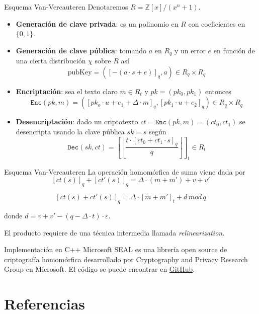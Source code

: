 \documentclass{beamer}
\begin{document}
\begin{frame}{Esquema Van-Vercauteren}
    Denotaremos $ R = \mathbb{Z} [x]/(x^n + 1) $.
\begin{itemize}
    \item \textbf{Generación de clave privada}: es un polinomio en $ R $ con coeficientes en $ \{ 0, 1 \} $.
    \item \textbf{Generación de clave pública}: tomando $ a $ en $ R_q $ y un error $ e $ en función de una cierta distribución $ \chi $ sobre $ R $ así $$ \mbox{pubKey} = ([-(a \cdot s + e)]_q, a) \in R_q \times R_q $$ 
    \item \textbf{Encriptación}: sea el texto claro $ m \in R_t $ y $ pk = (pk_0, pk_1) $ entonces $$  \texttt{Enc}(pk, m) = ([pk_o \cdot u  + e_1 + \Delta \cdot m]_q, [pk_1 \cdot u + e_2]_q) \in R_q \times R_q $$ 
    \item \textbf{Desencriptación}: dado un criptotexto $ ct = \texttt{Enc}(pk, m) = (ct_0, ct_1) $ se desencripta usando la clave pública $ sk = s $ según $$ \texttt{Dec}(sk, ct) = \left[ \left \lfloor  \dfrac{t \cdot [ct_0 + ct_1 \cdot s]_q }{q} \right \rfloor  \right]_t \in R_t $$
\end{itemize}
\end{frame}

\begin{frame}{Esquema Van-Vercauteren}
La operación homomórfica de suma viene dada por  
$$ [ct(s)]_q + [ct'(s)]_q = \Delta \cdot (m + m') + v + v' $$

$$ [ct(s) + ct'(s)]_q = \Delta \cdot [m + m']_t + d \, mod \, q $$

donde $ d = v + v' - (q - \Delta \cdot t) \cdot \varepsilon $.

El producto requiere de una técnica intermedia llamada \textit{relinearization}.    
\end{frame}


\begin{frame}{Implementación en C++}
Microsoft SEAL es una librería open source de criptografía homomórfica desarrollado por Cryptography and Privacy Research Group en Microsoft. El código se puede encontrar en \href{https://github.com/microsoft/SEAL}{GitHub}. 
\end{frame}

    
\section{Referencias}
\end{document}
